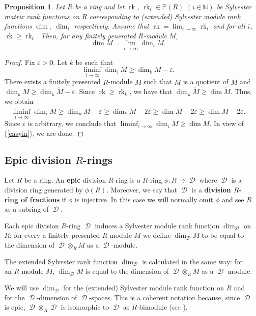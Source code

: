 \documentclass[11pt]{amsart}
\newtheorem{pro}[lem]{Proposition}
\numberwithin{claimcounter}{lem}
\DeclareMathOperator{\D}{\mathcal D}
\DeclareMathOperator{\rk}{rk}
\newcommand{\N}{\mathbb{N}}
\begin{document}
\begin{pro} \label{limitfg}Let $R$ be a ring and let $\rk$, $\rk_i\in \mathbb{P}(R)$ $(i\in \N)$ be  Sylvester matrix rank functions on $R$ corresponding to (extended) Sylvester module rank functions $\dim$,  $\dim_i$ respectively. Assume that $\rk=\displaystyle \lim_{i\to \infty} \rk_i$ and for all $i$, $\rk\ge \rk_i$. Then,  for any finitely generated $R$-module $M$, $$\dim M=\displaystyle  \lim_{i\to \infty} \dim_i M.$$
\end{pro}
\begin{proof} 
Fix $\varepsilon >0$. Let $k$ be such that
$$\liminf_{i\to \infty} \dim_i M\ge \dim_k M-\varepsilon .$$
There exists a finitely presented $R$-module  $\tilde M$ such that $M$ is a quotient of $\tilde M$ and $\dim_kM\ge \dim_k \tilde M-\varepsilon $. Since $\rk\ge \rk_k$, we have that $\dim_k \tilde M\ge \dim \tilde M$. Thus, we obtain
$$\liminf_{i\to \infty} \dim_i M\ge \dim_k M-\varepsilon \ge  \dim_k \tilde M-2\varepsilon \ge  \dim \tilde M-2\varepsilon \ge  \dim M-2\varepsilon .$$
Since $\varepsilon $ is arbitrary, we conclude that $\displaystyle \liminf_{i\to \infty} \dim_i M\ge   \dim M$. In view of (\ref{easyin}), we are done.
\end{proof} 

\subsection{Epic division $R$-rings}

Let $R$ be a ring. An {\bf epic} division $R$-ring is a $R$-ring $\phi: R\to \D$ where $\D$ is a division ring generated by $\phi(R)$.  %
Moreover, we say that  $\D$ is a {\bf division $R$-ring of fractions} if $\phi$ is injective. In this case we will normally omit $\phi$ and see $R$ as a subring of $\D$.

Each epic division $R$-ring $\D$ induces a Sylvester module rank function $\dim_{\D}$ on $R$: for every a finitely  presented $R$-module $M$ we define $\dim_{\D}M$ to be equal to the dimension of $\D\otimes_R M$ as a $\D$-module. 

The extended Sylvester rank function $\dim_{\D}$ is calculated in the same way: for an $R$-module $M$, $\dim_{\D}M$ is equal to the dimension of $\D\otimes_R M$ as a $\D$-module.

 We will use $\dim_{\D}$ for the (extended) Sylvester module rank function on $R$ and for the $\D$-dimension of $\D$-spaces. This is a coherent notation because, since $\D$ is epic, $\D\otimes_R\D$ is isomorphic to $\D$ as $R$-bimodule (see \cite[Section 4]{Jasurv19}). 
 
\end{document}
